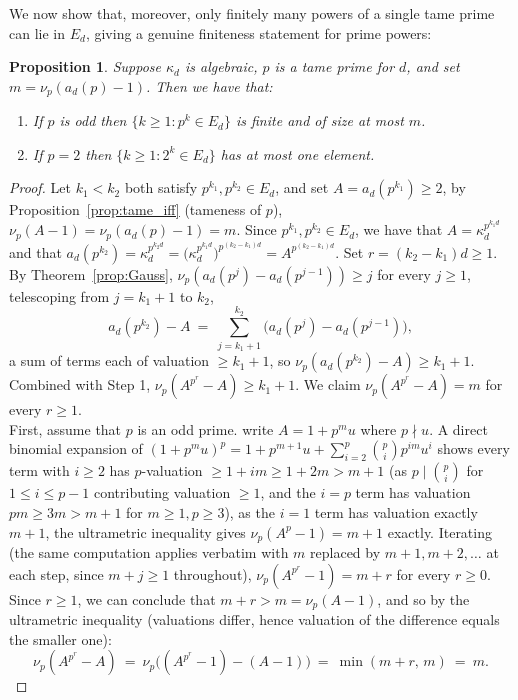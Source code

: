 \documentclass{article}
\theoremstyle{plain}
\newtheorem{proposition}[theorem]{Proposition}
\theoremstyle{definition}
\theoremstyle{remark}
\begin{document}
We now show that, moreover, only finitely many powers of a single tame prime can lie in $E_d$, giving a genuine finiteness statement for prime powers:

\begin{proposition}\label{thm:finiteexp}
Suppose $\kappa_d$ is algebraic, $p$ is a tame prime for $d$, and set $m=\nu_p(a_d(p)-1)$. Then we have that:
\begin{enumerate}
\item If $p$ is odd then $\{k\ge1 : p^k\in E_d\}$ is finite and of size at most $m$.
\item If $p=2$ then $\{k\ge1 : 2^k\in E_d\}$ has at most one element.
\end{enumerate}
\end{proposition}
\begin{proof}
Let $k_1<k_2$ both satisfy $p^{k_1},p^{k_2}\in E_d$, and set $A=a_d(p^{k_1})\ge2$, by Proposition~\ref{prop:tame_iff} (tameness of $p$), $\nu_p(A-1)=\nu_p(a_d(p)-1)=m$. Since $p^{k_1},p^{k_2}\in E_d$, we have that $A=\kappa_d^{p^{k_1d}}$ and that $a_d(p^{k_2})=\kappa_d^{p^{k_2d}}=\big(\kappa_d^{p^{k_1d}}\big)^{p^{(k_2-k_1)d}}=A^{p^{(k_2-k_1)d}}$. Set $r=(k_2-k_1)d\ge1$.  By Theorem~\ref{prop:Gauss}, $\nu_p(a_d(p^j)-a_d(p^{j-1}))\ge j$ for every $j\ge1$, telescoping from $j=k_1+1$ to $k_2$,
\[
a_d(p^{k_2})-A\ =\ \sum_{j=k_1+1}^{k_2}\big(a_d(p^j)-a_d(p^{j-1})\big),
\]
a sum of terms each of valuation $\ge k_1+1$, so $\nu_p(a_d(p^{k_2})-A)\ge k_1+1$. Combined with Step 1, $\nu_p(A^{p^r}-A)\ge k_1+1$. We claim $\nu_p(A^{p^r}-A)=m$ for every $r\ge1$.\\

First, assume that $p$ is an odd prime. write $A=1+p^mu$ where $p\nmid u$. A direct binomial expansion of $(1+p^mu)^p=1+p^{m+1}u+\sum_{i=2}^p\binom pip^{im}u^i$ shows every term with $i\ge2$ has $p$-valuation $\ge1+im\ge1+2m>m+1$ (as $p\mid\binom pi$ for $1\le i\le p-1$ contributing valuation $\ge1$, and the $i=p$ term has valuation $pm\ge3m>m+1$ for $m\ge1,p\ge3$), as the $i=1$ term has valuation exactly $m+1$, the ultrametric inequality gives $\nu_p(A^p-1)=m+1$ exactly. Iterating (the same computation applies verbatim with $m$ replaced by $m+1,m+2,\dots$ at each step, since $m+j\ge1$ throughout), $\nu_p(A^{p^r}-1)=m+r$ for every $r\ge0$. Since $r\ge1$, we can conclude that $m+r>m=\nu_p(A-1)$, and so by the ultrametric inequality (valuations differ, hence valuation of the difference equals the smaller one):
\[
\nu_p(A^{p^r}-A)\ =\ \nu_p\big((A^{p^r}-1)-(A-1)\big)\ =\ \min(m+r,\,m)\ =\ m.
\]


\end{proof}
\end{document}
